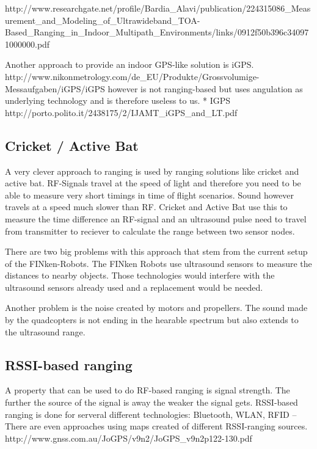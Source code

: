 http://www.researchgate.net/profile/Bardia\_Alavi/publication/224315086\_Measurement\_and\_Modeling\_of\_Ultrawideband\_TOA-Based\_Ranging\_in\_Indoor\_Multipath\_Environments/links/0912f50b396c340971000000.pdf 

Another approach to provide an indoor GPS-like solution is iGPS. http://www.nikonmetrology.com/de\_EU/Produkte/Grossvolumige-Messaufgaben/iGPS/iGPS  however is not ranging-based but uses angulation as underlying technology and is therefore useless to us.
  * IGPS http://porto.polito.it/2438175/2/IJAMT\_iGPS\_and\_LT.pdf

\subsection{Cricket / Active Bat}
A very clever approach to ranging is used by ranging solutions like cricket and active bat. 
RF-Signals travel at the speed of light and therefore you need to be able to measure very short timings in time of flight scenarios.
Sound however travels at a speed much slower than RF.
Cricket and Active Bat use this to measure the time difference an RF-signal and an ultrasound pulse need to travel from transmitter to reciever to calculate the range between two sensor nodes. 



There are two big problems with this approach that stem from the current setup of the FINken-Robots.
The FINken Robots use ultrasound sensors to measure the distances to nearby objects.
Those technologies would interfere with the ultrasound sensors already used and a replacement would be needed.

Another problem is the noise created by motors and propellers.
The sound made by the quadcopters is not ending in the hearable spectrum but also extends to the ultrasound range.

\subsection{RSSI-based ranging}

A property that can be used to do RF-based ranging is signal strength.
The further the source of the signal is away the weaker the signal gets.
RSSI-based ranging is done for serveral different technologies: Bluetooth, WLAN, RFID –
There are even approaches using maps created of different RSSI-ranging sources. http://www.gnss.com.au/JoGPS/v9n2/JoGPS\_v9n2p122-130.pdf 

